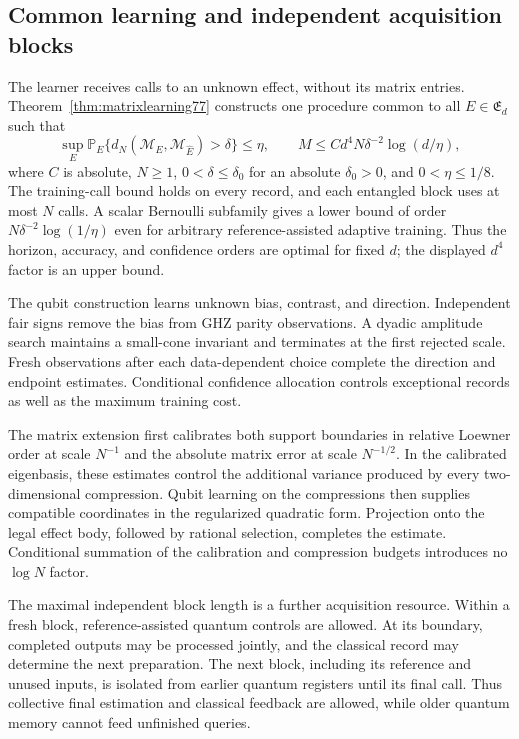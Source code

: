 \subsection{Common learning and independent acquisition blocks}
The learner receives calls to an unknown effect, without its matrix
entries.  Theorem~\ref{thm:matrixlearning77} constructs one procedure
common to all $E\in\mathfrak E_d$ such that
\begin{equation}\label{eq:introlearning77}
 \sup_E\mathbb P_E\{d_N(\mathcal M_E,\mathcal M_{\widehat E})
                         >\delta\}\le\eta,
 \qquad
 M\le Cd^4N\delta^{-2}\log(d/\eta),
\end{equation}
where $C$ is absolute, $N\ge1$, $0<\delta\le\delta_0$ for an
absolute $\delta_0>0$, and $0<\eta\le1/8$.  The training-call
bound holds on every record, and each entangled block uses at most
$N$ calls.  A scalar Bernoulli subfamily gives a lower bound of
order $N\delta^{-2}\log(1/\eta)$ even for arbitrary
reference-assisted adaptive training.  Thus the horizon, accuracy,
and confidence orders are optimal for fixed $d$; the displayed
$d^4$ factor is an upper bound.

The qubit construction learns unknown bias, contrast, and direction.
Independent fair signs remove the bias from GHZ parity observations.
A dyadic amplitude search maintains a small-cone invariant and
terminates at the first rejected scale.  Fresh observations after
each data-dependent choice complete the direction and endpoint
estimates.  Conditional confidence allocation controls exceptional
records as well as the maximum training cost.

The matrix extension first calibrates both support boundaries in
relative Loewner order at scale $N^{-1}$ and the absolute matrix
error at scale $N^{-1/2}$.  In the calibrated eigenbasis, these
estimates control the additional variance produced by every
two-dimensional compression.  Qubit learning on the compressions
then supplies compatible coordinates in the regularized quadratic
form.  Projection onto the legal effect body, followed by rational
selection, completes the estimate.  Conditional summation of the
calibration and compression budgets introduces no $\log N$ factor.

The maximal independent block length is a further acquisition
resource.  Within a fresh block, reference-assisted quantum controls
are allowed.  At its boundary, completed outputs may be processed
jointly, and the classical record may determine the next preparation.
The next block, including its reference and unused inputs, is
isolated from earlier quantum registers until its final call.
Thus collective final estimation and classical feedback are allowed,
while older quantum memory cannot feed unfinished queries.

